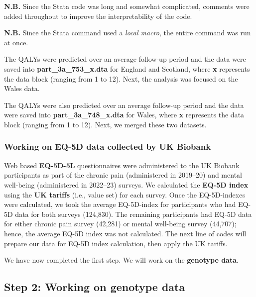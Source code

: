 \documentclass[11pt]{article}
\begin{document}
\textbf{N.B.} Since the Stata code was long and somewhat complicated, comments were added throughout to improve the interpretability of the code.

\textbf{N.B.} Since the Stata command used a \textit{local macro}, the entire command was run at once.
 
\color{violet} 
\begin{stlog}\end{stlog}
\color{black}
The QALYs were predicted over an average follow-up period and the data were saved into \textbf{part\_3a\_753\_x.dta} for England and Scotland, where \textbf{x} represents the data block (ranging from 1 to 12). Next, the analysis was focused on the Wales data.
\color{violet}
\begin{stlog}\end{stlog}
\color{black}
The QALYs were also predicted over an average follow-up period and the data were saved into \textbf{part\_3a\_748\_x.dta} for Wales, where \textbf{x} represents the data block (ranging from 1 to 12). Next, we merged these two datasets.
\color{violet}
\begin{stlog}\end{stlog}
\color{black}
\subsubsection{Working on EQ-5D data collected by UK Biobank}

Web based \textbf{EQ-5D-5L} questionnaires were administered to the UK Biobank participants as part of the chronic pain (administered in 2019--20) and mental well-being (administered in 2022--23) surveys. We calculated the \textbf{EQ-5D index} using the \textbf{UK tariffs} (i.e., value set) for each survey\cite{devlin2018valuing}. Once the EQ-5D-indexes were calculated, we took the average EQ-5D-index for participants who had EQ-5D data for both surveys (124,830). The remaining participants had EQ-5D data for either chronic pain survey (42,281) or mental well-being survey (44,707); hence, the average EQ-5D index was not calculated. The next line of codes will prepare our data for EQ-5D index calculation, then apply the UK tariffs.
\color{violet} 
\begin{stlog}\end{stlog}
\color{black}
We have now completed the first step. We will work on the \textbf{genotype data}.
\newpage

\subsection{Step 2: Working on genotype data}
\end{document}
